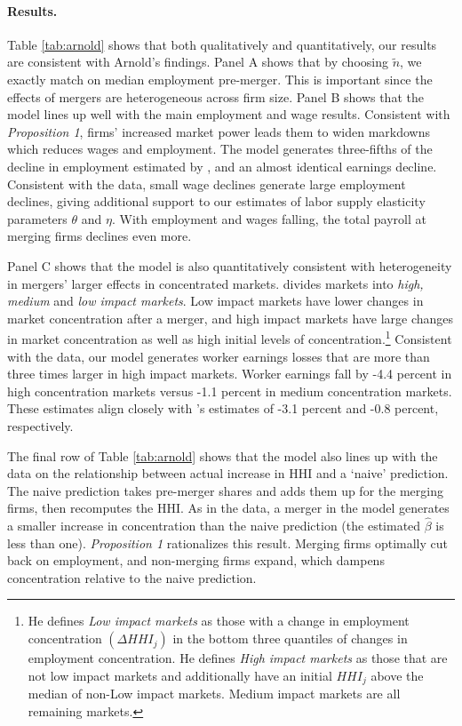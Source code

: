 \documentclass[12pt]{article}
\theoremstyle{prop}
\begin{document}
\paragraph{Results.}
 Table \ref{tab:arnold} shows that both qualitatively and quantitatively, our results are consistent with Arnold's findings.
 Panel A shows that by choosing $\widetilde{n}$, we exactly match on median employment pre-merger.
 This is important since the effects of mergers are heterogeneous across firm size.
 Panel B shows that the model lines up well with the main employment and wage results.
 Consistent with \emph{Proposition 1}, firms' increased market power leads them to widen markdowns which reduces wages and employment. 
 The model generates three-fifths of the decline in employment estimated by \citet{Arnold}, and an almost identical earnings decline.
 Consistent with the data, small wage declines generate large employment declines, giving additional support to our estimates of labor supply elasticity parameters $\theta$ and $\eta$. 
 With employment and wages falling, the total payroll at merging firms declines even more. 

Panel C shows that the model is also quantitatively consistent with heterogeneity in mergers' larger effects in concentrated markets. 
\citet{Arnold} divides markets into \emph{high, medium} and \emph{low impact markets}. 
Low impact markets have lower changes in market concentration after a merger, and high impact markets have large changes in market concentration as well as high initial levels of concentration.\footnote{
     He defines \emph{Low impact markets} as those with a change in employment concentration $(\Delta HHI_j)$ in the bottom three quantiles of changes in employment concentration.
     He defines \emph{High impact markets} as those that are not low impact markets and additionally have an initial $HHI_j$ above the median of non-Low impact markets.
     Medium impact markets are all remaining markets.} 
Consistent with the data, our model generates worker earnings losses that are more than three times larger in high impact markets. 
Worker earnings fall by -4.4 percent in high concentration markets versus -1.1 percent in medium concentration markets. 
These estimates align closely with \citet{Arnold}'s estimates of -3.1 percent and -0.8 percent, respectively. 

The final row of  Table \ref{tab:arnold} shows that the model also lines up with the data on the relationship between actual increase in HHI and a `naive' prediction. 
The naive prediction takes pre-merger shares and adds them up for the merging firms, then recomputes the HHI. 
As in the data, a merger in the model generates a smaller increase in concentration than the naive prediction (the estimated $\widehat{\beta}$ is less than one).
\emph{Proposition 1} rationalizes this result. 
Merging firms optimally cut back on employment, and non-merging firms expand, which dampens concentration relative to the naive prediction. 
\end{document}
